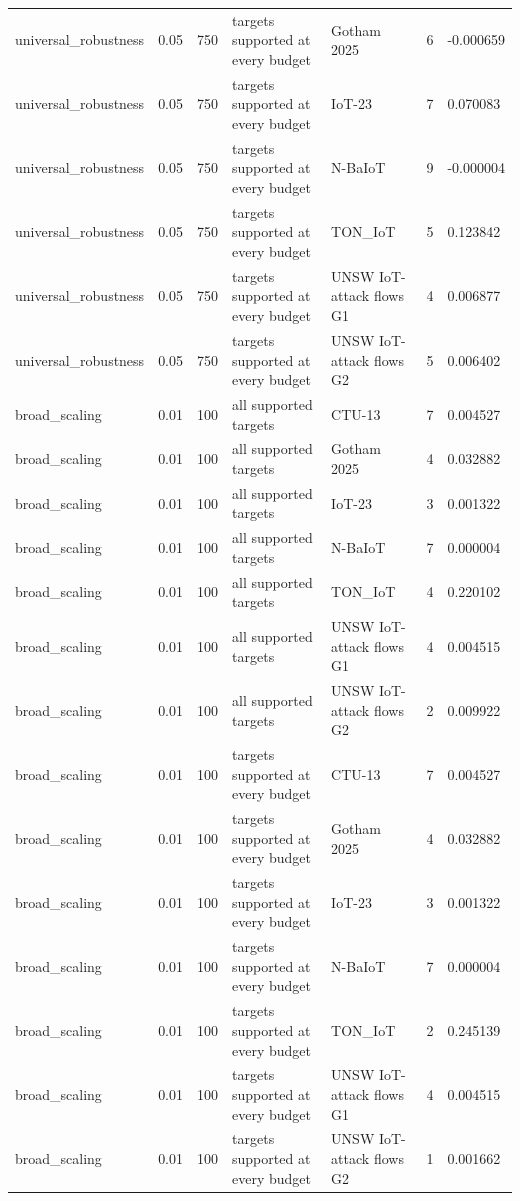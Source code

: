 \begin{tabular}{lllllll}
universal\_robustness & 0.05 & 750 & targets supported at every budget & Gotham 2025 & 6 & -0.000659 \\
universal\_robustness & 0.05 & 750 & targets supported at every budget & IoT-23 & 7 & 0.070083 \\
universal\_robustness & 0.05 & 750 & targets supported at every budget & N-BaIoT & 9 & -0.000004 \\
universal\_robustness & 0.05 & 750 & targets supported at every budget & TON\_IoT & 5 & 0.123842 \\
universal\_robustness & 0.05 & 750 & targets supported at every budget & UNSW IoT-attack flows G1 & 4 & 0.006877 \\
universal\_robustness & 0.05 & 750 & targets supported at every budget & UNSW IoT-attack flows G2 & 5 & 0.006402 \\
broad\_scaling & 0.01 & 100 & all supported targets & CTU-13 & 7 & 0.004527 \\
broad\_scaling & 0.01 & 100 & all supported targets & Gotham 2025 & 4 & 0.032882 \\
broad\_scaling & 0.01 & 100 & all supported targets & IoT-23 & 3 & 0.001322 \\
broad\_scaling & 0.01 & 100 & all supported targets & N-BaIoT & 7 & 0.000004 \\
broad\_scaling & 0.01 & 100 & all supported targets & TON\_IoT & 4 & 0.220102 \\
broad\_scaling & 0.01 & 100 & all supported targets & UNSW IoT-attack flows G1 & 4 & 0.004515 \\
broad\_scaling & 0.01 & 100 & all supported targets & UNSW IoT-attack flows G2 & 2 & 0.009922 \\
broad\_scaling & 0.01 & 100 & targets supported at every budget & CTU-13 & 7 & 0.004527 \\
broad\_scaling & 0.01 & 100 & targets supported at every budget & Gotham 2025 & 4 & 0.032882 \\
broad\_scaling & 0.01 & 100 & targets supported at every budget & IoT-23 & 3 & 0.001322 \\
broad\_scaling & 0.01 & 100 & targets supported at every budget & N-BaIoT & 7 & 0.000004 \\
broad\_scaling & 0.01 & 100 & targets supported at every budget & TON\_IoT & 2 & 0.245139 \\
broad\_scaling & 0.01 & 100 & targets supported at every budget & UNSW IoT-attack flows G1 & 4 & 0.004515 \\
broad\_scaling & 0.01 & 100 & targets supported at every budget & UNSW IoT-attack flows G2 & 1 & 0.001662 \\

\end{tabular}
